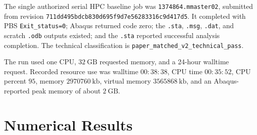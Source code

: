 The single authorized serial HPC baseline job was
\texttt{1374864.mmaster02}, submitted from revision
\texttt{711dd495bdcb830d695f9d7e56283316c9d417d5}. It completed with PBS
\texttt{Exit\_status=0}; Abaqus returned code zero; the \texttt{.sta},
\texttt{.msg}, \texttt{.dat}, and scratch \texttt{.odb} outputs existed; and
the \texttt{.sta} reported successful analysis completion. The technical
classification is \texttt{paper\_matched\_v2\_technical\_pass}.

The run used one CPU, \(32~\mathrm{GB}\) requested memory, and a 24-hour
walltime request. Recorded resource use was walltime \(00{:}38{:}38\), CPU
time \(00{:}35{:}52\), CPU percent \(95\), memory \(2970760~\mathrm{kb}\),
virtual memory \(3565868~\mathrm{kb}\), and an Abaqus-reported peak memory of
about \(2~\mathrm{GB}\).

\section{Numerical Results}

